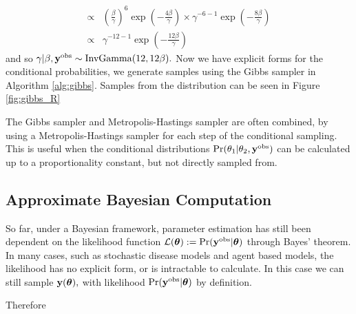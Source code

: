 \begin{example}
\begin{align*}
        \propto &
        \left(\frac{\beta}{\gamma}\right)^{6}
        \exp( -\frac{4\beta}{\gamma})
        \times \gamma^{- 6 - 1}\exp\left(-\frac{8\beta}{\gamma}\right) \\
        \propto & \gamma^{- 12 - 1}
        \exp\left(-\frac{12\beta}{\gamma}\right)
    \end{align*}
    and so
    $\gamma|\beta, \mathbf{y}^{\mathrm{obs}}
        \sim \mathrm{InvGamma}(12, 12\beta).$
    Now we have explicit forms for the conditional probabilities,
    we generate samples using the Gibbs sampler in Algorithm \ref{alg:gibbs}.
    Samples from the distribution can be seen in Figure \ref{fig:gibbs_R}
\end{example}

The Gibbs sampler and Metropolis-Hastings sampler are often combined, by
using a Metropolis-Hastings sampler for each step of the conditional sampling.
This is useful when the conditional distributions
$\Pr(\theta_1 | \theta_2, \mathbf{y}^{\mathrm{obs}})$ can be calculated up to a proportionality
constant, but not directly sampled from.

\subsection*{Approximate Bayesian Computation}

So far, under a Bayesian framework, parameter estimation has still been
dependent on the likelihood function
$\mathcal{L}(\bm{\theta}) := \Pr(\mathbf{y}^{\mathrm{obs}}|\bm{\theta})$ through Bayes' theorem.
In many cases, such as stochastic disease models and agent based models, the
likelihood has no explicit form, or is intractable to calculate. 
In this case we can still
sample $\mathbf{y}(\bm{\theta}),$ with likelihood $\Pr(\mathbf{y}^{\mathrm{obs}} | \bm{\theta})$ by definition.

Therefore